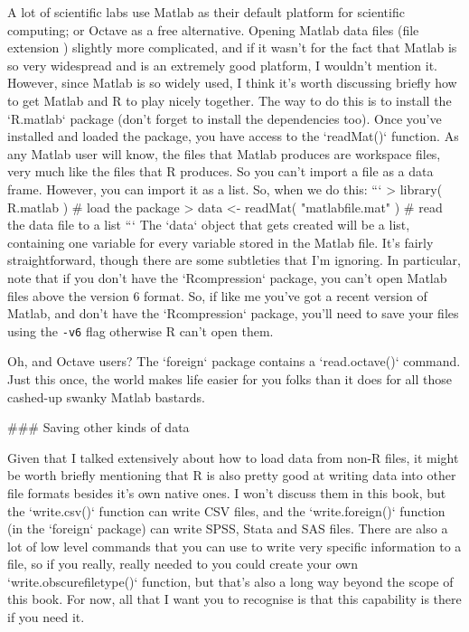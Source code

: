 A lot of scientific labs use Matlab as their default platform for scientific computing; or Octave as a free alternative. Opening Matlab data files (file extension ) slightly more complicated, and if it wasn't for the fact that Matlab is so very widespread and is an extremely good platform, I wouldn't mention it. However, since Matlab is so widely used, I think it's worth discussing briefly how to get Matlab and R to play nicely together. The way to do this is to install the `R.matlab` package (don't forget to install the dependencies too). Once you've installed and loaded the package, you have access to the `readMat()` function. As any Matlab user will know, the  files that Matlab produces are workspace files, very much like the  files that R produces. So you can't import a  file as a data frame. However, you can import it as a list. So, when we do this:
```
> library( R.matlab )                   # load the package
> data <- readMat( "matlabfile.mat" )   # read the data file to a list
```
The `data` object that gets created will be a list, containing one variable for every variable stored in the Matlab file. It's fairly straightforward, though there are some subtleties that I'm ignoring. In particular, note that if you don't have the `Rcompression` package, you can't open Matlab files above the version 6 format. So, if like me you've got a recent version of Matlab, and don't have the `Rcompression` package, you'll need to save your files using the \verb#-v6# flag otherwise R can't open them.


Oh, and Octave users? The `foreign` package contains a `read.octave()` command. Just this once, the world makes life easier for you folks than it does for all those cashed-up swanky Matlab bastards. 


### Saving other kinds of data

Given that I talked extensively about how to load data from non-R files, it might be worth briefly mentioning that R is also pretty good at writing data into other file formats besides it's own native ones. I won't discuss them in this book, but the `write.csv()` function can write CSV files, and the `write.foreign()` function (in the `foreign` package) can write SPSS, Stata and SAS files. There are also a lot of low level commands that you can use to write very specific information to a file, so if you really, really needed to you could create your own `write.obscurefiletype()` function, but that's also a long way beyond the scope of this book. For now, all that I want you to recognise is that this capability is there if you need it. 



